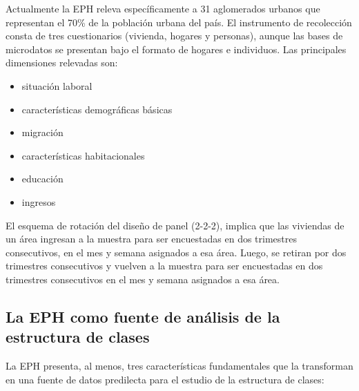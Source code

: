\documentclass[
]{book}
\providecommand{\tightlist}{%
  \setlength{\itemsep}{0pt}\setlength{\parskip}{0pt}}
\begin{document}
Actualmente la EPH releva específicamente a 31 aglomerados urbanos que representan el 70\% de la población urbana del país. El instrumento de recolección consta de tres cuestionarios (vivienda, hogares y personas), aunque las bases de microdatos se presentan bajo el formato de hogares e individuos. Las principales dimensiones relevadas son:

\begin{itemize}
\tightlist
\item
  situación laboral
\item
  características demográficas básicas
\item
  migración
\item
  características habitacionales
\item
  educación
\item
  ingresos
\end{itemize}

El esquema de rotación del diseño de panel (2-2-2), implica que las viviendas de un área ingresan a la muestra para ser encuestadas en dos trimestres consecutivos, en el mes y semana asignados a esa área. Luego, se retiran por dos trimestres consecutivos y vuelven a la muestra para ser encuestadas en dos trimestres consecutivos en el mes y semana asignados a esa área.

\hypertarget{la-eph-como-fuente-de-anuxe1lisis-de-la-estructura-de-clases}{%
\subsection{La EPH como fuente de análisis de la estructura de clases}\label{la-eph-como-fuente-de-anuxe1lisis-de-la-estructura-de-clases}}

La EPH presenta, al menos, tres características fundamentales que la transforman en una fuente de datos predilecta para el estudio de la estructura de clases:
\end{document}

